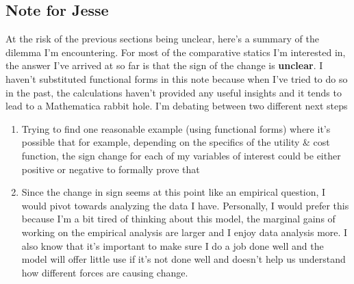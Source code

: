 \documentclass[source/paper/main.tex]{subfiles}
\begin{document}
\subsection{Note for Jesse}
At the risk of the previous sections being unclear, here's a summary of the dilemma I'm encountering. For most of the comparative statics I'm interested in, the answer I've arrived at so far is that the sign of the change is \textbf{unclear}. I haven't substituted functional forms in this note because when I've tried to do so in the past, the calculations haven't provided any useful insights and it tends to lead to a Mathematica rabbit hole. I'm debating between two different next steps
\begin{enumerate}
    \item Trying to find one reasonable example (using functional forms) where it's possible that for example, depending on the specifics of the utility \& cost function, the sign change for each of my variables of interest could be either positive or negative to formally prove that
    \item Since the change in sign seems at this point like an empirical question, I would pivot towards analyzing the data I have. Personally, I would prefer this because I'm a bit tired of thinking about this model, the marginal gains of working on the empirical analysis are larger and I enjoy data analysis more. I also know that it's important to make sure I do a job done well and the model will offer little use if it's not done well and doesn't help us understand how different forces are causing change. 
\end{enumerate}
\end{document}
